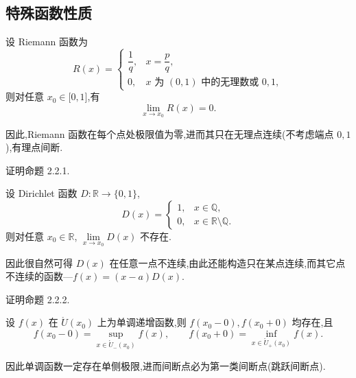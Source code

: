\documentclass[../数学分析培优讲义.tex]{subfiles}
\begin{document}
\subsection{特殊函数性质}

\begin{proposition}
设 Riemann 函数为
\[
R(x)=
\begin{cases}
    \dfrac{1}{q}, & x=\dfrac{p}{q},\\
    0, & x\text{ 为 }(0,1)\text{ 中的无理数或 }0,1,
\end{cases}
\]
则对任意 $x_0\in\lbrack 0,1\rbrack$,有
\[
    \lim\limits_{x\to x_0}R(x)=0.
\]
\end{proposition}

\begin{remark}
因此,Riemann 函数在每个点处极限值为零,进而其只在无理点连续(不考虑端点 $0,1$),有理点间断.
\end{remark}

\begin{example}
证明命题 2.2.1.
\end{example}
\exampleblank

\begin{proposition}
设 Dirichlet 函数 $D:\mathbb{R}\to\{0,1\}$,
\[
D(x)=
\begin{cases}
    1, & x\in\mathbb{Q},\\
    0, & x\in\mathbb{R}\setminus\mathbb{Q}.
\end{cases}
\]
则对任意 $x_0\in\mathbb{R}$,
$\displaystyle\lim\limits_{x\to x_0}D(x)$ 不存在.
\end{proposition}

\begin{remark}
因此很自然可得 $D(x)$ 在任意一点不连续,由此还能构造只在某点连续,而其它点不连续的函数---$f(x)=(x-a)D(x)$.
\end{remark}

\begin{example}
证明命题 2.2.2.
\end{example}
\exampleblank

\begin{proposition}
设 $f(x)$ 在 $\mathring{U}(x_0)$ 上为单调递增函数,则 $f(x_0-0),f(x_0+0)$ 均存在,且
\[
    f(x_0-0)=\sup\limits_{x\in\mathring{U}_{-}(x_0)}f(x),
    \qquad
    f(x_0+0)=\inf\limits_{x\in\mathring{U}_{+}(x_0)}f(x).
\]
\end{proposition}

\begin{remark}
因此单调函数一定存在单侧极限,进而间断点必为第一类间断点(跳跃间断点).
\end{remark}
\end{document}

